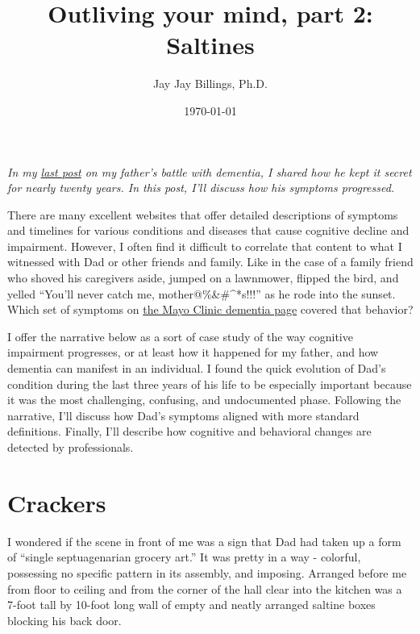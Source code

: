 \documentclass{article}
\title{Outliving your mind, part 2: Saltines}
\author{Jay Jay Billings, Ph.D.}
\date{\today}
\begin{document}
\maketitle

\textit{In my \href{https://jayjaybillings.com/2023/07/06/outliving-your-mind-part-1-the-secret/}{last post} on my father's battle with dementia, I shared how he kept it secret for nearly twenty years. In this post, I'll discuss how his symptoms progressed.}

There are many excellent websites that offer detailed descriptions of symptoms and timelines for various conditions and diseases that cause cognitive decline and impairment. However, I often find it difficult to correlate that content to what I witnessed with Dad or other friends and family. Like in the case of a family friend who shoved his caregivers aside, jumped on a lawnmower, flipped the bird, and yelled ``You'll never catch me, mother@\%\&\#\^\@*s!!!'' as he rode into the sunset. Which set of symptoms on \href{https://www.mayoclinic.org/diseases-conditions/dementia/symptoms-causes/syc-20352013}{the Mayo Clinic dementia page} covered that behavior?

I offer the narrative below as a sort of case study of the way cognitive impairment progresses, or at least how it happened for my father, and how dementia can manifest in an individual. I found the quick evolution of Dad's condition during the last three years of his life to be especially important because it was the most challenging, confusing, and undocumented phase. Following the narrative, I'll discuss how Dad's symptoms aligned with more standard definitions. Finally, I'll describe how cognitive and behavioral changes are detected by professionals.

\section*{Crackers}

I wondered if the scene in front of me was a sign that Dad had taken up a form of ``single septuagenarian grocery art.'' It was pretty in a way - colorful, possessing no specific pattern in its assembly, and imposing. Arranged before me from floor to ceiling and from the corner of the hall clear into the kitchen was a 7-foot tall by 10-foot long wall of empty and neatly arranged saltine boxes blocking his back door.
\end{document}
